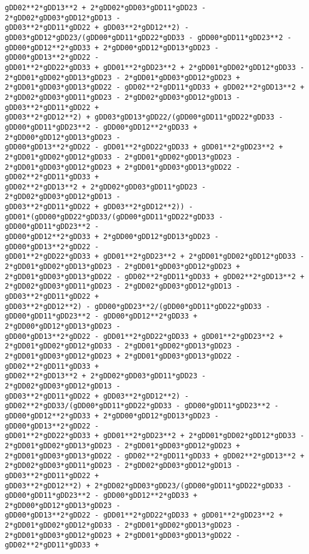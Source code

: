 \documentclass[landscape,letterpaper,10pt,english]{article}
\begin{document}
\begin{Verbatim}[commandchars=\\\{\}]
gDD02**2*gDD13**2 + 2*gDD02*gDD03*gDD11*gDD23 - 2*gDD02*gDD03*gDD12*gDD13 -
gDD03**2*gDD11*gDD22 + gDD03**2*gDD12**2) -
gDD03*gDD12*gDD23/(gDD00*gDD11*gDD22*gDD33 - gDD00*gDD11*gDD23**2 -
gDD00*gDD12**2*gDD33 + 2*gDD00*gDD12*gDD13*gDD23 - gDD00*gDD13**2*gDD22 -
gDD01**2*gDD22*gDD33 + gDD01**2*gDD23**2 + 2*gDD01*gDD02*gDD12*gDD33 -
2*gDD01*gDD02*gDD13*gDD23 - 2*gDD01*gDD03*gDD12*gDD23 +
2*gDD01*gDD03*gDD13*gDD22 - gDD02**2*gDD11*gDD33 + gDD02**2*gDD13**2 +
2*gDD02*gDD03*gDD11*gDD23 - 2*gDD02*gDD03*gDD12*gDD13 - gDD03**2*gDD11*gDD22 +
gDD03**2*gDD12**2) + gDD03*gDD13*gDD22/(gDD00*gDD11*gDD22*gDD33 -
gDD00*gDD11*gDD23**2 - gDD00*gDD12**2*gDD33 + 2*gDD00*gDD12*gDD13*gDD23 -
gDD00*gDD13**2*gDD22 - gDD01**2*gDD22*gDD33 + gDD01**2*gDD23**2 +
2*gDD01*gDD02*gDD12*gDD33 - 2*gDD01*gDD02*gDD13*gDD23 -
2*gDD01*gDD03*gDD12*gDD23 + 2*gDD01*gDD03*gDD13*gDD22 - gDD02**2*gDD11*gDD33 +
gDD02**2*gDD13**2 + 2*gDD02*gDD03*gDD11*gDD23 - 2*gDD02*gDD03*gDD12*gDD13 -
gDD03**2*gDD11*gDD22 + gDD03**2*gDD12**2)) -
gDD01*(gDD00*gDD22*gDD33/(gDD00*gDD11*gDD22*gDD33 - gDD00*gDD11*gDD23**2 -
gDD00*gDD12**2*gDD33 + 2*gDD00*gDD12*gDD13*gDD23 - gDD00*gDD13**2*gDD22 -
gDD01**2*gDD22*gDD33 + gDD01**2*gDD23**2 + 2*gDD01*gDD02*gDD12*gDD33 -
2*gDD01*gDD02*gDD13*gDD23 - 2*gDD01*gDD03*gDD12*gDD23 +
2*gDD01*gDD03*gDD13*gDD22 - gDD02**2*gDD11*gDD33 + gDD02**2*gDD13**2 +
2*gDD02*gDD03*gDD11*gDD23 - 2*gDD02*gDD03*gDD12*gDD13 - gDD03**2*gDD11*gDD22 +
gDD03**2*gDD12**2) - gDD00*gDD23**2/(gDD00*gDD11*gDD22*gDD33 -
gDD00*gDD11*gDD23**2 - gDD00*gDD12**2*gDD33 + 2*gDD00*gDD12*gDD13*gDD23 -
gDD00*gDD13**2*gDD22 - gDD01**2*gDD22*gDD33 + gDD01**2*gDD23**2 +
2*gDD01*gDD02*gDD12*gDD33 - 2*gDD01*gDD02*gDD13*gDD23 -
2*gDD01*gDD03*gDD12*gDD23 + 2*gDD01*gDD03*gDD13*gDD22 - gDD02**2*gDD11*gDD33 +
gDD02**2*gDD13**2 + 2*gDD02*gDD03*gDD11*gDD23 - 2*gDD02*gDD03*gDD12*gDD13 -
gDD03**2*gDD11*gDD22 + gDD03**2*gDD12**2) -
gDD02**2*gDD33/(gDD00*gDD11*gDD22*gDD33 - gDD00*gDD11*gDD23**2 -
gDD00*gDD12**2*gDD33 + 2*gDD00*gDD12*gDD13*gDD23 - gDD00*gDD13**2*gDD22 -
gDD01**2*gDD22*gDD33 + gDD01**2*gDD23**2 + 2*gDD01*gDD02*gDD12*gDD33 -
2*gDD01*gDD02*gDD13*gDD23 - 2*gDD01*gDD03*gDD12*gDD23 +
2*gDD01*gDD03*gDD13*gDD22 - gDD02**2*gDD11*gDD33 + gDD02**2*gDD13**2 +
2*gDD02*gDD03*gDD11*gDD23 - 2*gDD02*gDD03*gDD12*gDD13 - gDD03**2*gDD11*gDD22 +
gDD03**2*gDD12**2) + 2*gDD02*gDD03*gDD23/(gDD00*gDD11*gDD22*gDD33 -
gDD00*gDD11*gDD23**2 - gDD00*gDD12**2*gDD33 + 2*gDD00*gDD12*gDD13*gDD23 -
gDD00*gDD13**2*gDD22 - gDD01**2*gDD22*gDD33 + gDD01**2*gDD23**2 +
2*gDD01*gDD02*gDD12*gDD33 - 2*gDD01*gDD02*gDD13*gDD23 -
2*gDD01*gDD03*gDD12*gDD23 + 2*gDD01*gDD03*gDD13*gDD22 - gDD02**2*gDD11*gDD33 +

\end{Verbatim}
\end{document}
